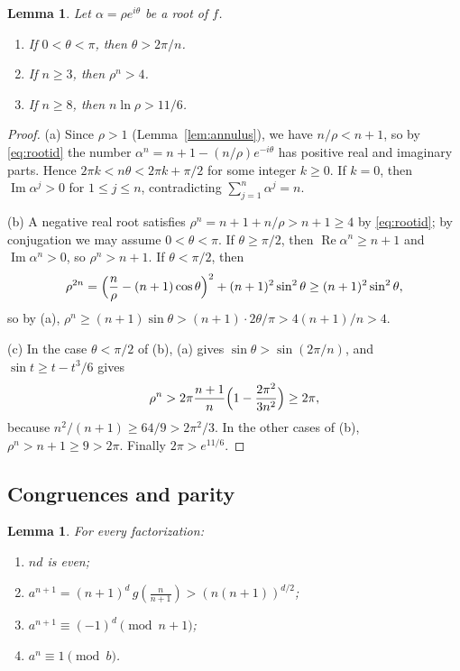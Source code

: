 \documentclass[11pt]{amsart}
\newtheorem{lemma}[theorem]{Lemma}
\theoremstyle{definition}
\theoremstyle{remark}
\numberwithin{equation}{section}
\begin{document}
\begin{lemma}\label{lem:r-inner}
Let $\alpha=\rho e^{i\theta}$ be a root of $f$.
\begin{enumerate}
\item[(a)] If $0<\theta<\pi$, then $\theta>2\pi/n$.
\item[(b)] If $n\ge3$, then $\rho^n>4$.
\item[(c)] If $n\ge8$, then $n\ln\rho>11/6$.
\end{enumerate}
\end{lemma}

\begin{proof}
(a) Since $\rho>1$ (Lemma~\ref{lem:annulus}), we have $n/\rho<n+1$, so by
\eqref{eq:rootid} the number $\alpha^n=n+1-(n/\rho)e^{-i\theta}$ has positive
real and imaginary parts. Hence $2\pi k<n\theta<2\pi k+\pi/2$ for some
integer $k\ge0$. If $k=0$, then $\operatorname{Im}\alpha^j>0$ for
$1\le j\le n$, contradicting $\sum_{j=1}^n\alpha^j=n$.

(b) A negative real root satisfies $\rho^n=n+1+n/\rho>n+1\ge4$ by
\eqref{eq:rootid}; by conjugation we may assume $0<\theta<\pi$. If
$\theta\ge\pi/2$, then $\operatorname{Re}\alpha^n\ge n+1$ and
$\operatorname{Im}\alpha^n>0$, so $\rho^n>n+1$. If $\theta<\pi/2$, then
\[
 \rho^{2n}=\Bigl(\frac n\rho-(n+1)\cos\theta\Bigr)^2+(n+1)^2\sin^2\theta
 \ge (n+1)^2\sin^2\theta ,
\]
so by (a), $\rho^n\ge (n+1)\sin\theta>(n+1)\cdot 2\theta/\pi>4(n+1)/n>4$.

(c) In the case $\theta<\pi/2$ of (b), (a) gives $\sin\theta>\sin(2\pi/n)$,
and $\sin t\ge t-t^3/6$ gives
\[
 \rho^n>2\pi\frac{n+1}n\Bigl(1-\frac{2\pi^2}{3n^2}\Bigr)\ge2\pi,
\]
because $n^2/(n+1)\ge64/9>2\pi^2/3$. In the other cases of (b),
$\rho^n>n+1\ge9>2\pi$. Finally $2\pi>e^{11/6}$.
\end{proof}

\subsection{Congruences and parity}\label{ssec:r-cong}

\begin{lemma}\label{lem:r-norm}
For every factorization:
\begin{enumerate}
\item[(a)] $nd$ is even;
\item[(b)] $a^{n+1}=(n+1)^d\,g(\tfrac n{n+1})>(n(n+1))^{d/2}$;
\item[(c)] $a^{n+1}\equiv(-1)^d\pmod{n+1}$;
\item[(d)] $a^n\equiv1\pmod b$.
\end{enumerate}
\end{lemma}
\end{document}
